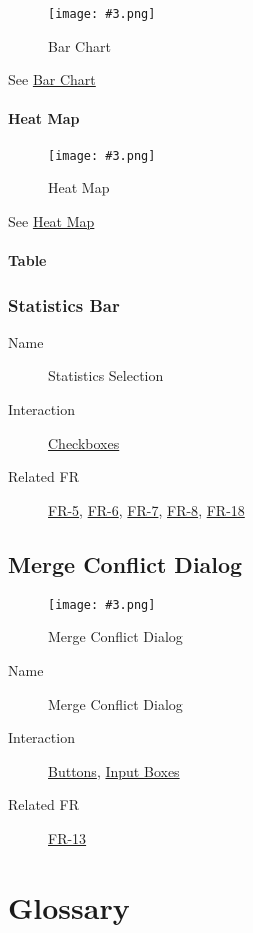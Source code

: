 \documentclass[10pt,a4paper]{report}
\newcommand{\refer}[2]{\hyperref[#1]{\textcolor{col:reference}{#2}}}
\newcommand{\ui}[3]{
    \begin{description}
        \item[Name]{#1}
        \item[Interaction]{#2}
        \item[Related FR]{#3}
    \end{description}
}
\newcommand{\refg}[2]{\refer{glo:#1}{#2}}
\newcommand{\includeimage}[5]{
    \begin{figure}[H]
        #1
        \texttt{[image: \#3.png]}
        \caption{#4}
        \label{fig:#5}
    \end{figure}
}
\newcommand{\includegraph}[7]{
    \graphicspath{{#1}}
    \includeimage{#2}{#3}{#4}{#5}{#6}
    \graphicspath{{#7}}
}
\newcommand{\imagepath}{Images/}
\newcommand{\graphpath}{Images/Graphs/}
\begin{document}
\includegraph{\graphpath}{}{0.4}{Bar Chart}{Bar Chart}{bar_chart}{\imagepath}
See \refg{bar_chart}{Bar Chart}

\subsubsection{Heat Map}

\includegraph{\graphpath}{}{0.4}{Heat Map}{Heat Map}{heat_map}{\imagepath}
See \refg{heatmap}{Heat Map}

\subsubsection{Table}

\subsection{Statistics Bar}
\label{sec:visualizer:statistics}
\ui{Statistics Selection}{\refer{it:checkbox}{Checkboxes}}{\refer{FR-5}{FR-5}, \refer{FR-6}{FR-6}, \refer{FR-7}{FR-7}, \refer{FR-8}{FR-8}, \refer{FR-18}{FR-18}}

\section{Merge Conflict Dialog}
\label{sec:merge_conflict}
\includeimage{}{0.5}{Merge Conflict Dialog}{Merge Conflict Dialog}{Merge Conflict Dialog}
\ui{Merge Conflict Dialog}{\refer{it:button}{Buttons}, \refer{it:input_box}{Input Boxes}}{\refer{FR-13}{FR-13}}

\chapter{Glossary}
\end{document}
